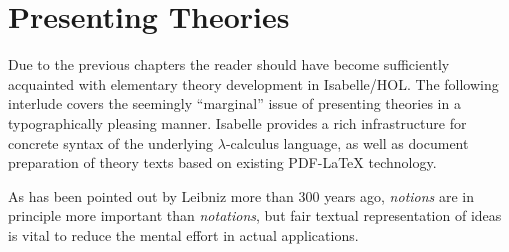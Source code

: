 
\chapter{Presenting Theories}
\label{ch:thy-present}

Due to the previous chapters the reader should have become sufficiently
acquainted with elementary theory development in Isabelle/HOL.  The following
interlude covers the seemingly ``marginal'' issue of presenting theories in a
typographically pleasing manner.  Isabelle provides a rich infrastructure for
concrete syntax of the underlying $\lambda$-calculus language, as well as
document preparation of theory texts based on existing PDF-{\LaTeX}
technology.

As has been pointed out by Leibniz more than
300 years ago, \emph{notions} are in principle more important than
\emph{notations}, but fair textual representation of ideas is vital to reduce
the mental effort in actual applications.




